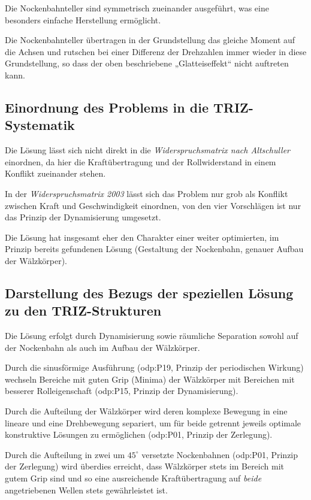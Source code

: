 \documentclass[11pt,a4paper]{article}
\begin{document}
Die Nockenbahnteller sind symmetrisch zueinander ausgeführt, was eine
besonders einfache Herstellung ermöglicht.

Die Nockenbahnteller übertragen in der Grundstellung das gleiche Moment auf
die Achsen und rutschen bei einer Differenz der Drehzahlen immer wieder in
diese Grundstellung, so dass der oben beschriebene „Glatteiseffekt“ nicht
auftreten kann.

\subsection{Einordnung des Problems in die TRIZ-Systematik}

Die Lösung lässt sich nicht direkt in die \emph{Widerspruchsmatrix nach
  Altschuller} einordnen, da hier die Kraftübertragung und der Rollwiderstand
in einem Konflikt zueinander stehen.

In der \emph{Widerspruchsmatrix 2003} lässt sich das Problem nur grob als
Konflikt zwischen Kraft und Geschwindigkeit einordnen, von den  vier
Vorschlägen ist nur das Prinzip der Dynamisierung umgesetzt.

Die Lösung hat insgesamt eher den Charakter einer weiter optimierten, im
Prinzip bereits gefundenen Lösung (Gestaltung der Nockenbahn, genauer Aufbau
der Wälzkörper).

\subsection{Darstellung des Bezugs der speziellen Lösung zu den
  TRIZ-Strukturen} 

Die Lösung erfolgt durch Dynamisierung sowie räumliche Separation sowohl auf
der Nockenbahn als auch im Aufbau der Wälzkörper.

Durch die sinusförmige Ausführung (odp:P19, Prinzip der periodischen Wirkung)
wechseln Bereiche mit guten Grip (Minima) der Wälz\-körper mit Bereichen mit
besserer Rolleigenschaft (odp:P15, Prinzip der Dynamisierung).

Durch die Aufteilung der Wälzkörper wird deren komplexe Bewegung in eine
lineare und eine Drehbewegung separiert, um für beide getrennt jeweils
optimale konstruktive Lösungen zu ermöglichen (odp:P01, Prinzip der
Zerlegung).

Durch die Aufteilung in zwei um $45^\circ$ versetzte Nockenbahnen (odp:P01,
Prinzip der Zerlegung) wird überdies erreicht, dass Wälzkörper stets im
Bereich mit gutem Grip sind und so eine ausreichende Kraftübertragung auf
\emph{beide} angetriebenen Wellen stets gewährleistet ist.
\end{document}
